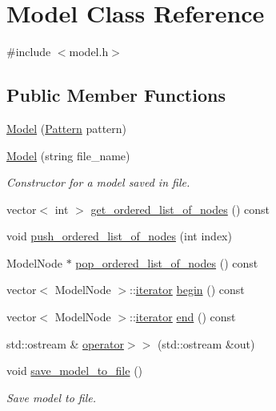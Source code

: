 \hypertarget{classModel}{\section{Model Class Reference}
\label{classModel}
}


{\ttfamily \#include $<$model.\+h$>$}

\subsection*{Public Member Functions}
\begin{DoxyCompactItemize}
\item 
\hyperlink{classModel_a2970c96c9a3976c0887cb06f71753f1e}{Model} (\hyperlink{classPattern}{Pattern} pattern)
\item 
\hyperlink{classModel_a555e27949c7a209f607d77e5d57c1599}{Model} (string file\+\_\+name)
\begin{DoxyCompactList}\small\item\em Constructor for a model saved in file. \end{DoxyCompactList}\item 
vector$<$ int $>$ \hyperlink{classModel_ad821b67839a18f6fc6af508823ba73e0}{get\+\_\+ordered\+\_\+list\+\_\+of\+\_\+nodes} () const 
\item 
void \hyperlink{classModel_a6f2fa936b9d754d971f2972716b41656}{push\+\_\+ordered\+\_\+list\+\_\+of\+\_\+nodes} (int index)
\item 
Model\+Node $\ast$ \hyperlink{classModel_a7bae5e69e7ca1d5bb8a04c74148c82f0}{pop\+\_\+ordered\+\_\+list\+\_\+of\+\_\+nodes} () const 
\item 
vector$<$ Model\+Node $>$\+::\hyperlink{classModel_a0cfbe847990e80cb9033e8a3257bced2}{iterator} \hyperlink{classModel_a035c58a162aad06dad63a2be8976e17c}{begin} () const 
\item 
vector$<$ Model\+Node $>$\+::\hyperlink{classModel_a0cfbe847990e80cb9033e8a3257bced2}{iterator} \hyperlink{classModel_ad66f8045b3632a366af4f38b2042cf19}{end} () const 
\item 
std\+::ostream \& \hyperlink{classModel_a466e585afab385972eea3c8bd51f14f8}{operator$>$$>$} (std\+::ostream \&out)
\item 
void \hyperlink{classModel_afa9087f16c68b0c7cb67c5a285dde750}{save\+\_\+model\+\_\+to\+\_\+file} ()
\begin{DoxyCompactList}\small\item\em Save model to file. \end{DoxyCompactList}\end{DoxyCompactItemize}
